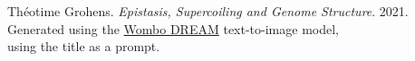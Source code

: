 \begin{vplace}[3]
\centering
Théotime Grohens.
\emph{Epistasis, Supercoiling and Genome Structure}.
2021. \\
Generated using the \href{https://www.wombo.art/}{Wombo DREAM} text-to-image model, \\ using the title as a prompt.
\end{vplace}
\thispagestyle{empty}
